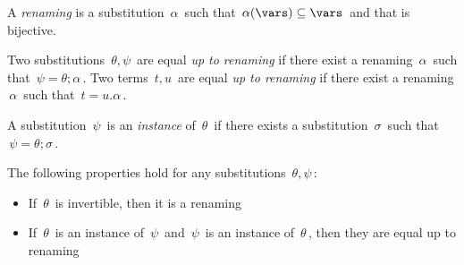 

{A \emph{renaming} is a substitution $\,\alpha\,$ such that $\,\alpha(\vars)\subseteq \vars\,$ and that is bijective.

\smallskip Two substitutions $\,\theta,\psi\,$ are equal \emph{up to renaming} if there exist a renaming $\,\alpha\,$ such that $\,\psi=\theta;\alpha\,$.
Two terms $\,t,u\,$ are equal \emph{up to renaming} if there exist a renaming $\,\alpha\,$ such that $\,t=u.\alpha\,$.

\smallskip A substitution $\,\psi\,$ is an \emph{instance} of $\,\theta\,$ if there exists a substitution $\,\sigma\,$ such that $\,\psi=\theta;\sigma\,$.

}

\proposition%
	{\label{folklore}The following properties hold for any substitutions $\,\theta,\psi\,$:
	\begin{itemize}%
		\item If $\,\theta\,$ is invertible, then it is a renaming
		\item If $\,\theta\,$ is an instance of $\,\psi\,$ and $\,\psi\,$ is an instance of $\,\theta\,$, then they are equal up to renaming
	\end{itemize}
}

